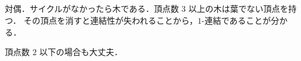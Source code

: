 \subsection{}
対偶．サイクルがなかったら木である．頂点数 $3$ 以上の木は葉でない頂点を持つ．
その頂点を消すと連結性が失われることから，$1$-連結であることが分かる．

頂点数 $2$ 以下の場合も大丈夫．